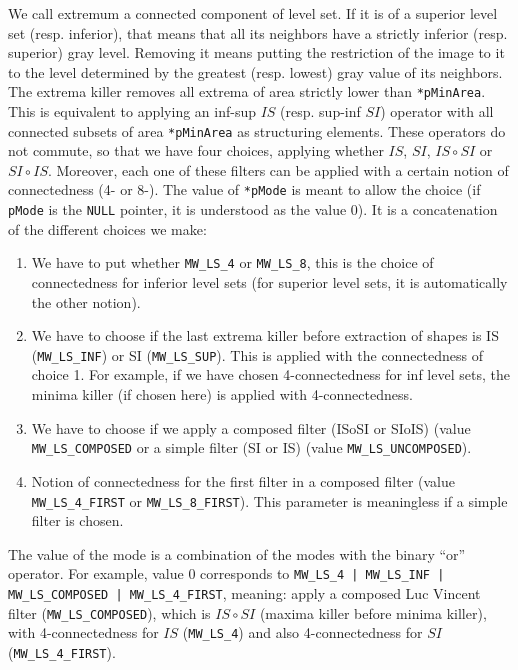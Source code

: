 We call extremum a connected component of level set. If it is of a superior
level set (resp. inferior), that means that all its neighbors have a strictly
inferior (resp. superior) gray level. Removing it means putting the
restriction of the image to it to the level determined by the greatest
(resp. lowest) gray value of its neighbors. The extrema killer removes all
extrema of area strictly lower than \texttt{*pMinArea}. This is equivalent to
applying an inf-sup $IS$ (resp. sup-inf $SI$) operator with all connected
subsets of area \texttt{*pMinArea} as structuring elements. These operators do
not commute, so that we have four choices, applying whether $IS$, $SI$,
$IS\circ SI$ or $SI\circ IS$. Moreover, each one of these filters can be
applied with a certain notion of connectedness (4- or 8-). The value of
\texttt{*pMode} is meant to allow the choice (if \texttt{pMode} is the
\texttt{NULL} pointer, it is understood as the value 0). It is a concatenation
of the different choices we make:

\begin{enumerate}
\item We have to put whether \texttt{MW\_LS\_4} or \texttt{MW\_LS\_8}, this is the
choice of connectedness for inferior level sets (for superior level sets, it
is automatically the other notion).
\item We have to choose if the last extrema killer before extraction of
shapes is IS (\texttt{MW\_LS\_INF}) or SI (\texttt{MW\_LS\_SUP}). This is applied
with the connectedness of choice 1. For example, if we have chosen
4-connectedness for inf level sets, the minima killer (if chosen here) is
applied with 4-connectedness.
\item We have to choose if we apply a composed filter (ISoSI or SIoIS) (value
\texttt{MW\_LS\_COMPOSED} or a simple filter (SI or IS) (value
\texttt{MW\_LS\_UNCOMPOSED}).
\item Notion of connectedness for the first filter in a composed filter (value
\texttt{MW\_LS\_4\_FIRST} or \texttt{MW\_LS\_8\_FIRST}). This
parameter is meaningless if a simple filter is chosen.
\end{enumerate}

The value of the mode is a combination of the modes with the binary ``or''
operator. For example, value 0 corresponds to \texttt{MW\_LS\_4 | MW\_LS\_INF |
MW\_LS\_COMPOSED | MW\_LS\_4\_FIRST}, meaning: apply a composed Luc Vincent filter
(\texttt{MW\_LS\_COMPOSED}), which is $IS\circ SI$ (maxima killer before
minima killer), with 4-connectedness for $IS$ (\texttt{MW\_LS\_4}) and also
4-connectedness for $SI$ (\texttt{MW\_LS\_4\_FIRST}).

